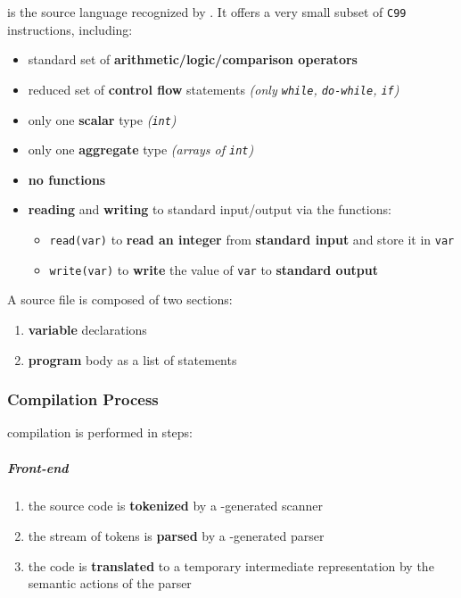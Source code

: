 \documentclass[english]{article}
\begin{document}
\lance is the source language recognized by \acse.
It offers a very small subset of \texttt{C99} instructions, including:

\begin{itemize}[label=\textbf{\texttt{>}}]
  \item standard set of \textbf{arithmetic/logic/comparison operators}
  \item reduced set of \textbf{control flow} statements \textit{(only \texttt{while}, \texttt{do-while}, \texttt{if})}
  \item only one \textbf{scalar} type \textit{(\texttt{int})}
  \item only one \textbf{aggregate} type \textit{(arrays of \texttt{int})}
  \item \textbf{no functions}
  \item \textbf{reading} and \textbf{writing} to standard input/output via the functions:
        \begin{itemize}
          \item \texttt{read(var)} to \textbf{read an integer} from \textbf{standard input} and store it in \texttt{var}
          \item \texttt{write(var)} to \textbf{write} the value of \texttt{var} to \textbf{standard output}
        \end{itemize}
\end{itemize}

A \lance source file is composed of two sections:

\begin{enumerate}
  \item \textbf{variable} declarations
  \item \textbf{program} body as a list of statements
\end{enumerate}

\subsubsection{Compilation Process}

\acse compilation is performed in steps:

\subparagraph*{Front-end}
\begin{enumerate}
  \item the source code is \textbf{tokenized} by a \flex-generated scanner
  \item the stream of tokens is \textbf{parsed} by a \bison-generated parser
  \item the code is \textbf{translated} to a temporary intermediate representation by the semantic actions of the parser
\end{enumerate}
\end{document}
